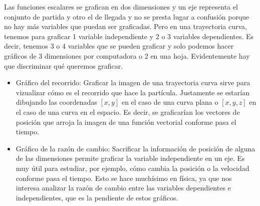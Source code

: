 \documentclass[a5paper,12pt,twoside]{book}
\begin{document}
Las funciones escalares se grafican en dos dimensiones y un eje representa el conjunto de partida y otro el de llegada y no se presta lugar a confusión porque no hay más variables que puedan ser graficadas. Pero en una trayectoria curva, tenemos para graficar 1 variable independiente y 2 o 3 variables dependientes. Es decir, tenemos 3 o 4 variables que se pueden graficar y solo podemos hacer gráficos de 3 dimensiones por computadora o 2 en una hoja. Evidentemente hay que discriminar qué queremos graficar.

\begin{itemize}
    \item Gráfico del recorrido: Graficar la imagen de una trayectoria curva sirve para vizualizar cómo es el recorrido que hace la partícula. Justamente se estarían dibujando las coordenadas $[x,y]$ en el caso de una curva plana o $[x,y,z]$ en el caso de una curva en el espacio. Es decir, se graficarían los vectores de posición que arroja la imagen de una función vectorial conforme pasa el tiempo.
    
    \item Gráfico de la razón de cambio: Sacrificar la información de posición de alguna de las dimensiones permite graficar la variable independiente en un eje. Es muy útil para estudiar, por ejemplo, cómo cambia la posición o la velocidad conforme pasa el tiempo. Esto se hace muchísimo en física, ya que nos interesa analizar la razón de cambio entre las variables dependientes e independientes, que es la pendiente de estos gráficos.
\end{itemize}
\end{document}
